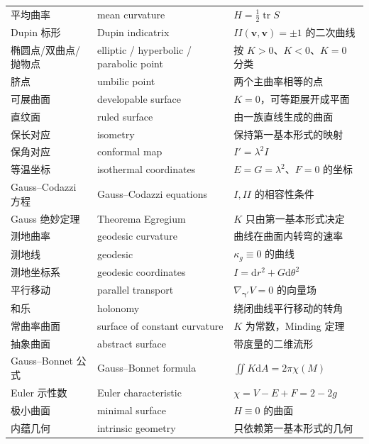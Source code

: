 \documentclass[UTF8,11pt,a4paper]{ctexart}
\newcommand{\dd}{\mathrm{d}}
\newcommand{\bv}{\mathbf{v}}
\newcommand{\bgamma}{\boldsymbol{\gamma}}
\begin{document}
\begin{longtable}{@{}>{\RaggedRight\arraybackslash}p{3.5cm}>{\RaggedRight\arraybackslash}p{4.6cm}>{\RaggedRight\arraybackslash}p{6.6cm}@{}}
平均曲率 & mean curvature & $H=\frac12\operatorname{tr}S$ \\
Dupin 标形 & Dupin indicatrix & $II(\bv,\bv)=\pm1$ 的二次曲线 \\
椭圆点/双曲点/抛物点 & elliptic / hyperbolic / parabolic point & 按 $K>0$、$K<0$、$K=0$ 分类 \\
脐点 & umbilic point & 两个主曲率相等的点 \\
可展曲面 & developable surface & $K=0$，可等距展开成平面 \\
直纹面 & ruled surface & 由一族直线生成的曲面 \\
保长对应 & isometry & 保持第一基本形式的映射 \\
保角对应 & conformal map & $I'=\lambda^2I$ \\
等温坐标 & isothermal coordinates & $E=G=\lambda^2$、$F=0$ 的坐标 \\
Gauss--Codazzi 方程 & Gauss--Codazzi equations & $I,II$ 的相容性条件 \\
Gauss 绝妙定理 & Theorema Egregium & $K$ 只由第一基本形式决定 \\
测地曲率 & geodesic curvature & 曲线在曲面内转弯的速率 \\
测地线 & geodesic & $\kappa_g\equiv0$ 的曲线 \\
测地坐标系 & geodesic coordinates & $I=\dd r^2+G\dd\theta^2$ \\
平行移动 & parallel transport & $\nabla_{\bgamma'}V=0$ 的向量场 \\
和乐 & holonomy & 绕闭曲线平行移动的转角 \\
常曲率曲面 & surface of constant curvature & $K$ 为常数，Minding 定理 \\
抽象曲面 & abstract surface & 带度量的二维流形 \\
Gauss--Bonnet 公式 & Gauss--Bonnet formula & $\iint K\dd A=2\pi\chi(M)$ \\
Euler 示性数 & Euler characteristic & $\chi=V-E+F=2-2g$ \\
极小曲面 & minimal surface & $H\equiv0$ 的曲面 \\
内蕴几何 & intrinsic geometry & 只依赖第一基本形式的几何 \\
\bottomrule
\end{longtable}
\normalsize
\end{document}
